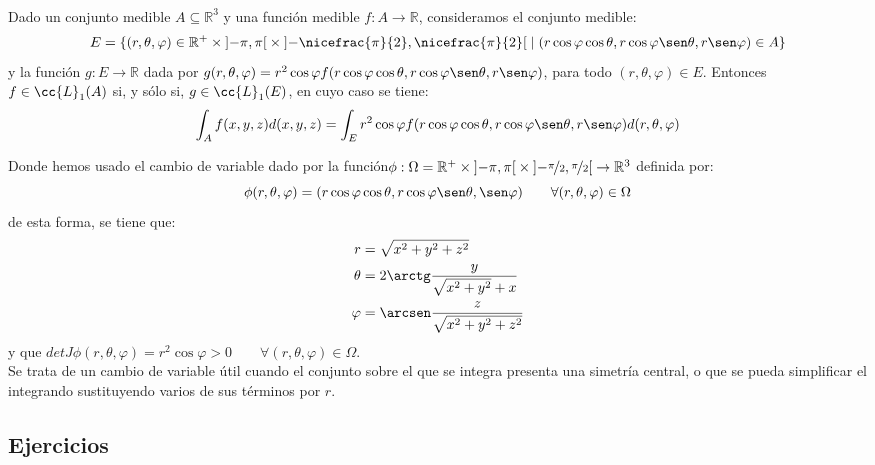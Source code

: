 \begin{teo}\ \\
    Dado un conjunto medible $A\subseteq \mathbb{R}^3$ y una función medible $f:A\to \mathbb{R}$, consideramos el conjunto medible:
    \begin{equation*}
        E = \{(r, \theta,\varphi)\in \mathbb{R}^+ \times \left]-\pi,\pi\right[\times\left]-\nicefrac{\pi}{2},\nicefrac{\pi}{2}\right[ \mid (r\cos\varphi\cos\theta,r\cos\varphi\sen\theta,r\sen\varphi )\in A\}
    \end{equation*}
    y la función $g:E\to \mathbb{R}$ dada por $g(r, \theta,\varphi)=r^2\cos\varphi f(r\cos\varphi\cos\theta, r\cos\varphi\sen\theta,r\sen\varphi)$, para todo $(r, \theta,\varphi)\in E$. Entonces $f\in \cc{L}_1(A)$ si, y sólo si, $g\in \cc{L}_1(E)$, en cuyo caso se tiene:
    \begin{equation*}
        \int_A f(x,y,z)d(x,y,z) = \int_E r^2\cos\varphi f(r\cos\varphi\cos\theta, r\cos\varphi\sen\theta,r\sen\varphi)d(r,\theta,\varphi)
    \end{equation*}
\end{teo}

Donde hemos usado el cambio de variable dado por la función\newline ${\phi:\Omega=\mathbb{R}^+ \times \left]-\pi,\pi\right[\times\left]-\nicefrac{\pi}{2},\nicefrac{\pi}{2}\right[ \to \mathbb{R}^3}$ definida por:
\begin{equation*}
    \phi(r,\theta,\varphi) = (r\cos\varphi\cos\theta, r\cos\varphi\sen\theta,\sen\varphi)\qquad \forall (r,\theta,\varphi)\in \Omega
\end{equation*}
de esta forma, se tiene que:
\begin{align*}
    r &= \sqrt{x^2+y^2+z^2} \\
    \theta &= 2\arctg \dfrac{y}{\sqrt{x^2+y^2}+x} \\
    \varphi &= \arcsen \dfrac{z}{\sqrt{x^2+y^2+z^2}}
\end{align*}
y que $detJ\phi(r,\theta,\varphi)=r^2\cos\varphi >0\qquad \forall (r, \theta,\varphi)\in \Omega$.\\

Se trata de un cambio de variable útil cuando el conjunto sobre el que se integra presenta una simetría central, o que se pueda simplificar el integrando sustituyendo varios de sus términos por $r$.

\subsection{Ejercicios}

